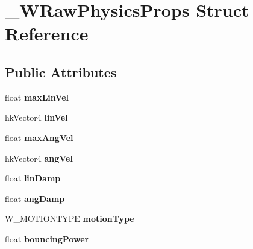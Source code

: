 \hypertarget{struct___w_raw_physics_props}{}\section{\+\_\+\+W\+Raw\+Physics\+Props Struct Reference}
\label{struct___w_raw_physics_props}
\subsection*{Public Attributes}
\begin{DoxyCompactItemize}
\item 
float {\bfseries max\+Lin\+Vel}\hypertarget{struct___w_raw_physics_props_a3bc0bf8bff7810fe6febfff1510c02a3}{}\label{struct___w_raw_physics_props_a3bc0bf8bff7810fe6febfff1510c02a3}

\item 
hk\+Vector4 {\bfseries lin\+Vel}\hypertarget{struct___w_raw_physics_props_a8c2ea8e46ff6ce1aa9ae42c5c6f8cfab}{}\label{struct___w_raw_physics_props_a8c2ea8e46ff6ce1aa9ae42c5c6f8cfab}

\item 
float {\bfseries max\+Ang\+Vel}\hypertarget{struct___w_raw_physics_props_a2cf829093376e4803ae5487e9c03c5f6}{}\label{struct___w_raw_physics_props_a2cf829093376e4803ae5487e9c03c5f6}

\item 
hk\+Vector4 {\bfseries ang\+Vel}\hypertarget{struct___w_raw_physics_props_ab286c61cb1cea2a83d8dc6f844370847}{}\label{struct___w_raw_physics_props_ab286c61cb1cea2a83d8dc6f844370847}

\item 
float {\bfseries lin\+Damp}\hypertarget{struct___w_raw_physics_props_a1263d31236651c820bf97b07f12d13d4}{}\label{struct___w_raw_physics_props_a1263d31236651c820bf97b07f12d13d4}

\item 
float {\bfseries ang\+Damp}\hypertarget{struct___w_raw_physics_props_ad7d8ab4f178f21635ef3c0b6b07af6a7}{}\label{struct___w_raw_physics_props_ad7d8ab4f178f21635ef3c0b6b07af6a7}

\item 
W\+\_\+\+M\+O\+T\+I\+O\+N\+T\+Y\+PE {\bfseries motion\+Type}\hypertarget{struct___w_raw_physics_props_a86e67ff8a04fb43dd8b6541ade1b06a1}{}\label{struct___w_raw_physics_props_a86e67ff8a04fb43dd8b6541ade1b06a1}

\item 
float {\bfseries bouncing\+Power}\hypertarget{struct___w_raw_physics_props_a9df16a5f110724d538421d425ec6d26e}{}\label{struct___w_raw_physics_props_a9df16a5f110724d538421d425ec6d26e}


\end{DoxyCompactItemize}
